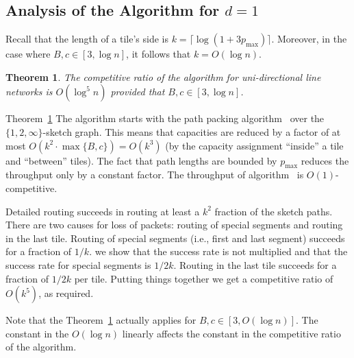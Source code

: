 \documentclass[11pt]{article}
\newtheorem{theorem}{Theorem}
\newcommand{\route}{\text{\sc{ipp}}}
\newcommand{\IPP}{\route}
\newcommand{\pmax}{p_{\max}}
\newenvironment{proof sketch}[1]{\noindent {\emph{Proof sketch of #1:}}}{\hfill \qed}
\begin{document}
\subsection{Analysis of the Algorithm for $d=1$}\label{sec:analysis}

Recall that the length of a tile's side is $k = \lceil \log
(1+3\pmax) \rceil$. Moreover, in the case where  $B,c \in
[3,\log n]$, it follows that $k = O ( \log n)$.



\begin{theorem}\label{thm:alg}
  The competitive ratio of the algorithm for uni-directional line networks is $O(\log^5 n)$ provided
  that $B,c \in [3,\log n]$.
\end{theorem}

\begin{proof sketch}{Theorem~\ref{thm:alg}}
The algorithm starts with the path packing algorithm \IPP\ over the $\{1,2,\infty\}$-sketch graph.
This means that capacities are reduced by a factor of at most $O(k^2 \cdot \max\{B,c\})=O(k^3)$ (by the capacity assignment ``inside'' a tile and ``between'' tiles).
The fact that path lengths are bounded by $\pmax$ reduces the throughput only by a constant factor. The throughput of algorithm \IPP\ is $O(1)$-competitive.

Detailed routing succeeds in routing at least a $k^2$ fraction of the sketch paths. There are two causes for loss of packets: routing of special segments and routing in the last tile.
Routing of special segments (i.e., first and last segment) succeeds for a fraction of $1/k$.
we show that the success rate is not multiplied and that the success rate for special segments is $1/2k$. Routing in the last tile succeeds for a fraction of $1/2k$ per tile.
Putting things together we get a competitive ratio of $O(k^5)$, as required.
\end{proof sketch}

Note that the Theorem~\ref{thm:alg} actually applies for $B,c \in [3,O(\log
n)]$. The constant in the $O(\log n)$ linearly affects the constant in the competitive ratio of the algorithm.
\end{document}
